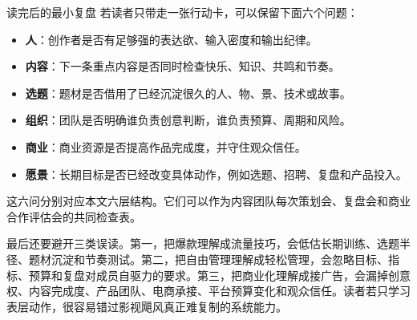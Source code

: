 \documentclass[a4paper]{article}
\begin{document}
\begin{importantbox}{读完后的最小复盘}
若读者只带走一张行动卡，可以保留下面六个问题：
\begin{itemize}
  \item \textbf{人}：创作者是否有足够强的表达欲、输入密度和输出纪律。
  \item \textbf{内容}：下一条重点内容是否同时检查快乐、知识、共鸣和节奏。
  \item \textbf{选题}：题材是否借用了已经沉淀很久的人、物、景、技术或故事。
  \item \textbf{组织}：团队是否明确谁负责创意判断，谁负责预算、周期和风险。
  \item \textbf{商业}：商业资源是否提高作品完成度，并守住观众信任。
  \item \textbf{愿景}：长期目标是否已经改变具体动作，例如选题、招聘、复盘和产品投入。
\end{itemize}
这六问分别对应本文六层结构。它们可以作为内容团队每次策划会、复盘会和商业合作评估会的共同检查表。
\end{importantbox}

最后还要避开三类误读。第一，把爆款理解成流量技巧，会低估长期训练、选题半径、题材沉淀和节奏测试。第二，把自由管理理解成轻松管理，会忽略目标、指标、预算和复盘对成员自驱力的要求。第三，把商业化理解成接广告，会漏掉创意权、内容完成度、产品团队、电商承接、平台预算变化和观众信任。读者若只学习表层动作，很容易错过影视飓风真正难复制的系统能力。
\end{document}
